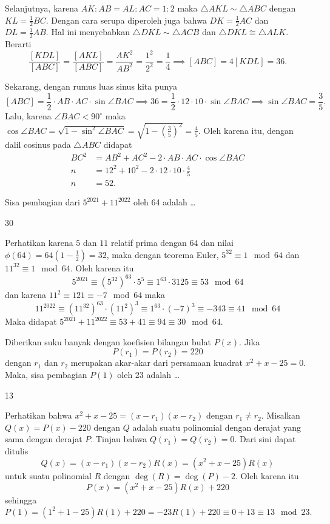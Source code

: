 \begin{solusi}
Selanjutnya, karena $AK:AB=AL:AC=1:2$ maka $\triangle AKL \sim \triangle ABC$ dengan $KL=\frac{1}{2}BC$. Dengan cara serupa diperoleh juga bahwa $DK=\frac{1}{2}AC$ dan $DL=\frac{1}{2}AB$. Hal ini menyebabkan $\triangle DKL \sim \triangle ACB$ dan $\triangle DKL \cong \triangle ALK$. Berarti 
$$\dfrac{[KDL]}{[ABC]}=\dfrac{[AKL]}{[ABC]}=\dfrac{AK^2}{AB^2}=\dfrac{1^2}{2^2}=\dfrac{1}{4} \implies [ABC] = 4[KDL] = 36.$$

Sekarang, dengan rumus luas sinus kita punya
$$[ABC] = \dfrac{1}{2}\cdot AB \cdot AC \cdot \sin \angle BAC \implies 36=\dfrac{1}{2}\cdot 12 \cdot 10 \cdot \sin \angle BAC \implies \sin \angle BAC = \dfrac{3}{5}.$$
Lalu, karena $\angle BAC < 90^\circ$ maka $\cos \angle BAC = \sqrt{1-\sin^2 \angle BAC} = \sqrt{1 - (\frac{3}{5})^2} = \frac{4}{5}$. Oleh karena itu, dengan dalil cosinus pada $\triangle ABC$ didapat
\begin{align*}
BC^2 &= AB^2 + AC^2 -2\cdot AB \cdot AC \cdot \cos \angle BAC\\
n &= 12^2+10^2 - 2 \cdot 12 \cdot 10 \cdot \frac{4}{5}\\
n &= \boxed{52}.
\end{align*}
\end{solusi}

\begin{soalbaru}
Sisa pembagian dari $5^{2021}+11^{2022}$ oleh 64 adalah \dots
\end{soalbaru}
\begin{jawaban}
30
\end{jawaban}
\begin{solusi}
Perhatikan karena $5$ dan $11$ relatif prima dengan $64$ dan nilai $\phi(64) = 64(1-\frac{1}{2})=32$, maka dengan teorema Euler, $5^{32} \equiv 1 \mod 64$ dan $11^{32} \equiv 1 \mod 64$. Oleh karena itu
$$5^{2021} \equiv (5^{32})^{63} \cdot 5^5 \equiv 1^{63} \cdot 3125 \equiv 53 \mod 64$$
dan karena $11^2 \equiv 121 \equiv -7 \mod 64$ maka
$$11^{2022} \equiv (11^{32})^{63} \cdot (11^2)^3 \equiv 1^{63} \cdot (-7)^3 \equiv -343 \equiv 41 \mod 64$$
Maka didapat $5^{2021}+11^{2022} \equiv 53+41 \equiv 94 \equiv \boxed{30} \mod 64$.
\end{solusi}

\begin{soalbaru}
Diberikan suku banyak dengan koefisien bilangan bulat $P(x)$. Jika
$$P(r_1)=P(r_2)=220$$
dengan $r_1$ dan $r_2$ merupakan akar-akar dari persamaan kuadrat $x^2+x-25=0$. Maka, sisa pembagian $P(1)$ oleh $23$ adalah \dots
\end{soalbaru}
\begin{jawaban}
13
\end{jawaban}
\begin{solusi}
Perhatikan bahwa $x^2+x-25=(x-r_1)(x-r_2)$ dengan $r_1 \neq r_2$. Misalkan $Q(x) = P(x) - 220$ dengan $Q$ adalah suatu polinomial dengan derajat yang sama dengan derajat $P$. Tinjau bahwa $Q(r_1)=Q(r_2)=0$. Dari sini dapat ditulis
$$Q(x)=(x-r_1)(x-r_2)R(x)=(x^2+x-25)R(x)$$
untuk suatu polinomial $R$ dengan $\operatorname{deg}(R) = \operatorname{deg}(P)-2$. Oleh karena itu
$$P(x)=(x^2+x-25)R(x)+220$$ 
sehingga $$P(1) = (1^2+1-25)R(1) + 220 = -23R(1) + 220 \equiv 0 + 13 \equiv \boxed{13} \mod 23.$$
\end{solusi}

